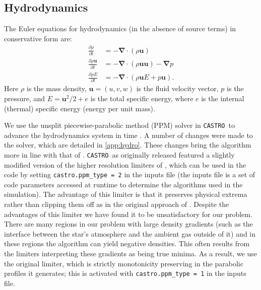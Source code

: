 \documentclass[iop,numberedappendix]{../emulateapj}
\newcommand{\castro}{\texttt{CASTRO}}
\begin{document}
\subsection{Hydrodynamics}\label{sec:Hydrodynamics}

The Euler equations for hydrodynamics (in the absence of source terms) in conservative form are: 
\begin{align}
  \frac{\partial \rho}{\partial t} &= -\bm{\nabla} \cdot (\rho \mathbf{u}) \label{eq:euler_density}\\
  \frac{\partial \rho \mathbf{u}}{\partial t} &= -\bm{\nabla} \cdot (\rho \mathbf{u}\mathbf{u}) - \bm{\nabla}p \label{eq:euler_momentum}\\
  \frac{\partial \rho E}{\partial t} &= -\bm{\nabla}\cdot(\rho\mathbf{u}E + p\mathbf{u}). \label{eq:euler_energy}
\end{align}
Here $\rho$ is the mass density, $\mathbf{u} = (u, v, w)$ is the fluid velocity
vector, $p$ is the pressure, and $E = \mathbf{u}^2 / 2 + e$ is the
total specific energy, where $e$ is the internal (thermal) specific
energy (energy per unit mass).

We use the unsplit piecewise-parabolic method (PPM) solver in \castro\
to advance the hydrodynamics system in time \citep{ppmunsplit}.  A
number of changes were made to the solver, which are detailed in \autoref{app:hydro}.
These changes bring the algorithm more in line with that of
\cite{ppm}. \castro\ as originally released featured a slightly modified
version of the higher resolution limiters of
\cite{colella_sekora:2008}, which can be used in the code by setting 
\texttt{castro.ppm\_type = 2} in the inputs file (the inputs file is
a set of code parameters accessed at runtime to determine the algorithms
used in the simulation). The advantage of this limiter is that
it preserves physical extrema rather than clipping them off as in the
original approach of \cite{ppm}. Despite the advantages of this limiter 
we have found it to be unsatisfactory for our problem. There are many regions in our
problem with large density gradients (such as the interface between
the star's atmosphere and the ambient gas outside of it) and in these
regions the algorithm can yield negative densities. This often results
from the limiters interpreting these gradients as being true
minima. As a result, we use the original limiter, which is strictly
monotonicity preserving in the parabolic profiles it generates; this
is activated with \texttt{castro.ppm\_type = 1} in the inputs file.
\end{document}
